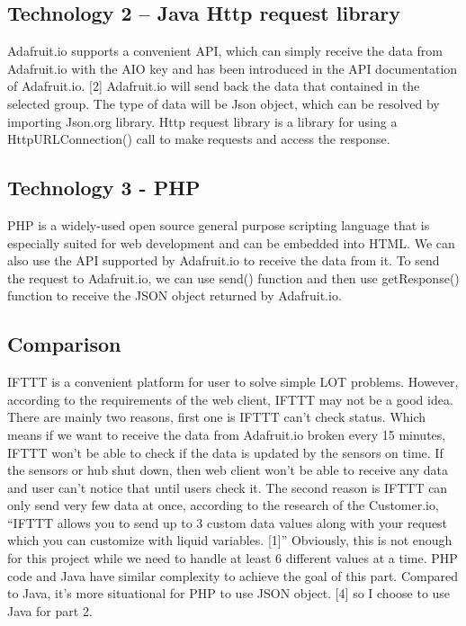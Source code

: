 \documentclass[10pt,onecolumn,journal,draftclsnofoot]{IEEEtran}
\begin{document}
    \subsection{Technology 2 – Java Http request library  }
	\par 
	Adafruit.io supports a convenient API, which can simply receive the data from Adafruit.io with the AIO key and has been introduced in the API documentation of Adafruit.io. [2] Adafruit.io will send back the data that contained in the selected group. The type of data will be Json object, which can be resolved by importing Json.org library. Http request library is a library for using a HttpURLConnection() call to make requests and access the response. 
	\subsection{Technology 3 - PHP}
    \par 
  	PHP is a widely-used open source general purpose scripting language that is especially suited for web development and can be embedded into HTML. We can also use the API supported by Adafruit.io to receive the data from it. To send the request to Adafruit.io, we can use send() function and then use getResponse() function to receive the JSON object returned by Adafruit.io.
    \subsection{Comparison}
    \par 
    IFTTT is a convenient platform for user to solve simple LOT problems. However, according to the requirements of the web client, IFTTT may not be a good idea. There are mainly two reasons, first one is IFTTT can’t check status. Which means if we want to receive the data from Adafruit.io broken every 15 minutes, IFTTT won’t be able to check if the data is updated by the sensors on time. If the sensors or hub shut down, then web client won’t be able to receive any data and user can’t notice that until users check it. The second reason is IFTTT can only send very few data at once, according to the research of the Customer.io, “IFTTT allows you to send up to 3 custom data values along with your request which you can customize with liquid variables. [1]” Obviously, this is not enough for this project while we need to handle at least 6 different values at a time. PHP code and Java have similar complexity to achieve the goal of this part. Compared to Java, it’s more situational for PHP to use JSON object. [4] so I choose to use Java for part 2.
\end{document}
